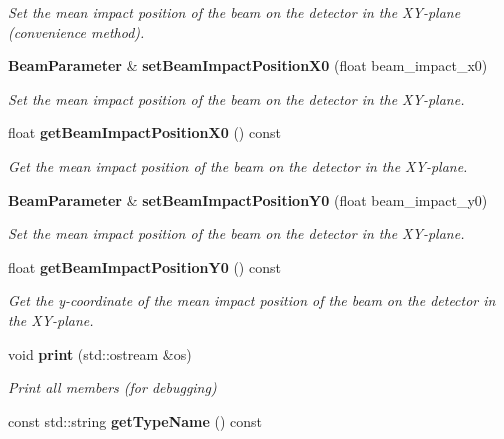 \begin{DoxyCompactItemize}
\begin{DoxyCompactList}\small\item\em Set the mean impact position of the beam on the detector in the X\-Y-\/plane (convenience method). \end{DoxyCompactList}\item 
{\bf Beam\-Parameter} \& {\bf set\-Beam\-Impact\-Position\-X0} (float beam\-\_\-impact\-\_\-x0)\label{classCALICE_1_1BeamParameter_a1ec83a4202220110e1f149dae22e6a60}

\begin{DoxyCompactList}\small\item\em Set the mean impact position of the beam on the detector in the X\-Y-\/plane. \end{DoxyCompactList}\item 
float {\bf get\-Beam\-Impact\-Position\-X0} () const \label{classCALICE_1_1BeamParameter_a3f9caa58f8a6b1dcc3b2a2effc056221}

\begin{DoxyCompactList}\small\item\em Get the mean impact position of the beam on the detector in the X\-Y-\/plane. \end{DoxyCompactList}\item 
{\bf Beam\-Parameter} \& {\bf set\-Beam\-Impact\-Position\-Y0} (float beam\-\_\-impact\-\_\-y0)\label{classCALICE_1_1BeamParameter_a21742c669e7e1319b384a56b9dad9d25}

\begin{DoxyCompactList}\small\item\em Set the mean impact position of the beam on the detector in the X\-Y-\/plane. \end{DoxyCompactList}\item 
float {\bf get\-Beam\-Impact\-Position\-Y0} () const \label{classCALICE_1_1BeamParameter_a467abe590bc12553cfc297744aeece5c}

\begin{DoxyCompactList}\small\item\em Get the y-\/coordinate of the mean impact position of the beam on the detector in the X\-Y-\/plane. \end{DoxyCompactList}\item 
void {\bf print} (std\-::ostream \&os)\label{classCALICE_1_1BeamParameter_a17b85ed30ff0f0d9eb1b2d1935ef9bed}

\begin{DoxyCompactList}\small\item\em Print all members (for debugging) \end{DoxyCompactList}\item 
const std\-::string {\bf get\-Type\-Name} () const \label{classCALICE_1_1BeamParameter_aa5a1c4f371d71c513584a106f69ee940}


\end{DoxyCompactItemize}

